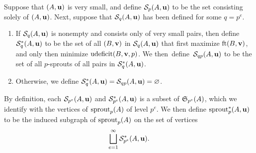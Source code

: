 \documentclass[11pt]{amsart}
\newcommand{\udeficit}{\operatorname{udeficit}}
\renewcommand{\S}{\mathcal{S}}
\begin{document}
\newpage


\begin{definition}  Suppose that $(A,\mathbf{u})$ is very small, and define $\S_p(A,\vv{u})$ to be the set consisting solely of $(A,\mathbf{u})$.
Next, suppose that $\S_q(A,\vv{u})$ has been defined for some $q=p^e$.
\begin{enumerate} 
\item If $\S_q(A,\vv{u})$ is nonempty and consists only of very small pairs, then define $\S^{\ast}_q(A,\vv{u})$ to be the set of all $(B,\mathbf{v})$ in $\S_q(A,\vv{u})$ that first maximize $\operatorname{ft}(B, \mathbf{v})$, and only then minimize $\udeficit(B,\vv{v},p)$.  We then~define~$\S_{qp}(A,\vv{u})$ to be the set of all $p$-sprouts of all pairs in $\S^{\ast}_q(A,\vv{u})$.
\item Otherwise, we define $\S_q^{\ast}(A,\vv{u})=\S_{qp}(A,\vv{u}) = \emptyset$.
\end{enumerate}

By definition,  each $\S_{p^e}(A,\vv{u})$ and $\S^{\ast}_{p^e}(A,\vv{u})$ is a subset of $\mathfrak{S}_{p^e}(A)$, which we identify with the vertices of $\operatorname{sprout}_p(A)$ of level $p^e$.    We then define $\operatorname{sprout}_p^{\ast}(A,\mathbf{u})$ to be the induced subgraph of $\operatorname{sprout}_p(A)$ on the set of vertices
\[ \bigsqcup_{e=1}^{\infty} \S^{\ast}_{p^e}(A,\vv{u}). \]
\end{definition}
\end{document}
